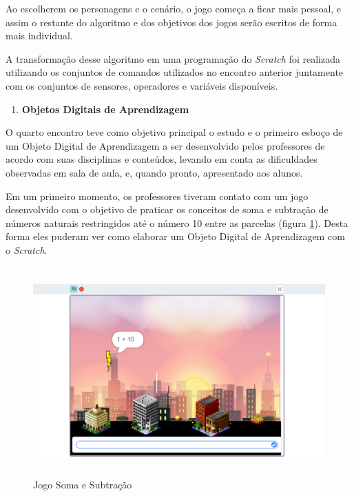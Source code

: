 \documentclass[12pt, openright, a4paper, brazil, english, french, spanish, bibjustif, openany, oneside]{abntex2}
\begin{document}
Ao escolherem os personagens e o cenário, o jogo começa a ficar mais pessoal, e assim o restante do algoritmo e dos objetivos dos jogos serão escritos de forma mais individual.

A transformação desse algoritmo em uma programação do \textit{Scratch} foi realizada utilizando os conjuntos de comandos utilizados no encontro anterior juntamente com os conjuntos de sensores, operadores e variáveis disponíveis.



\begin{enumerate}[resume,label=\textbf{\arabic*.}]

\item \textbf{Objetos Digitais de Aprendizagem}

\end{enumerate}

O quarto encontro teve como objetivo principal o estudo e o primeiro esboço de um Objeto Digital de Aprendizagem a ser desenvolvido pelos professores de acordo com suas disciplinas e conteúdos, levando em conta as dificuldades observadas em sala de aula, e, quando pronto, apresentado aos alunos.

Em um primeiro momento, os professores tiveram contato com um jogo desenvolvido com o objetivo de praticar os conceitos de soma e subtração de números naturais restringidos até o número 10 entre as parcelas (figura \ref{somaesub}). Desta forma eles puderam ver como elaborar um Objeto Digital de Aprendizagem com o \textit{Scratch}.

\begin{figure}[H]

    \center
    \caption{Jogo Soma e Subtração \label{somaesub}}
    \includegraphics[height=8cm]{somaesub.png}
    
\end{figure}
\end{document}
